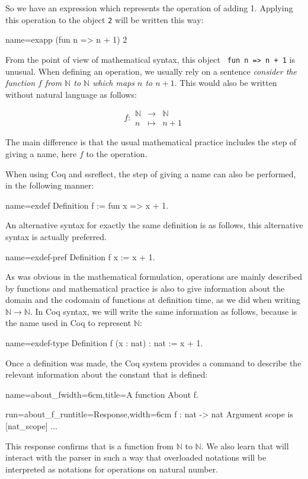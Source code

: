 So we have an expression which represents the operation of adding 1.
Applying this operation to the object {\tt 2} will be written this
way:

\begin{coq}{name=exapp}{}
  (fun n => n + 1) 2
\end{coq}
From the point of view of mathematical syntax, this object {\tt
  fun n => n + 1} is unusual.  When defining an operation, we usually
rely on a sentence {\em consider the function \(f\) from {\(\mathbb{N}\)}
to {\(\mathbb{N}\)} which maps \(n\) to \(n + 1\)}.  This would also be
written without natural language as follows:

\[f : 
\begin{array}{ccc}
{\mathbb{N}} &\rightarrow& {\mathbb{N}}\\
n &\mapsto& n + 1
\end{array}\]

The main difference is that the usual mathematical practice includes
the step of giving a name, here \(f\) to the operation.

When using Coq and ssreflect, the step of giving a name can also be
performed, in the following manner:

\begin{coq}{name=exdef}{}
Definition f := fun x => x + 1.
\end{coq}
An alternative syntax for exactly the same definition is as follows,
this alternative syntax is actually preferred.

\begin{coq}{name=exdef-pref}{}
Definition f x := x + 1.
\end{coq}
As was obvious in the mathematical formulation, operations are mainly
described by functions and mathematical practice is also to give
information about the domain and the codomain of functions at
definition time, as we did when writing
\({\mathbb{N}}\rightarrow{\mathbb{N}}\).  In Coq syntax, we will write
the same information as follows, because  is the name used in
Coq to represent \(\mathbb{N}\):

\begin{coq}{name=exdef-type}{}
Definition f (x : nat) : nat := x + 1.
\end{coq}

Once a definition was made, the Coq system provides a command to
describe the relevant information about the constant that is defined:

\begin{coq}{name=about_f}{width=6cm,title=A function}
About f.
\end{coq}
\begin{coqout}{run=about_f_run}{title=Response,width=6cm}
f : nat -> nat
Argument scope is [nat_scope] ...
\end{coqout}
This response confirms that  is a function from
\({\mathbb{N}}\) to \({\mathbb{N}}\).  We also learn that  
will interact with the parser in such a way that overloaded notations
will be interpreted as notations for operations on natural number.

